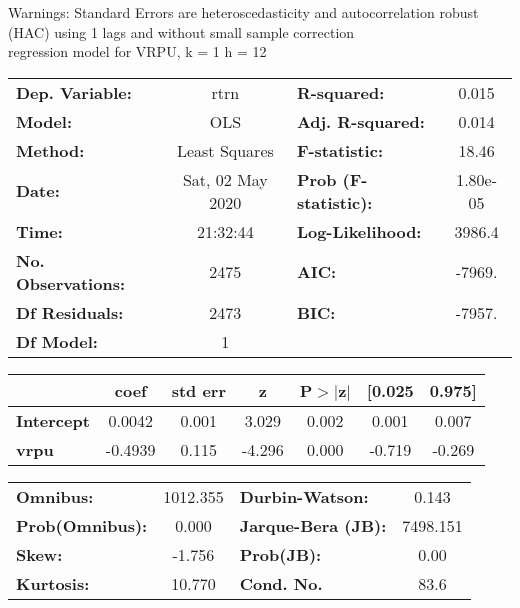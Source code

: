 Warnings: \newline
 [1] Standard Errors are heteroscedasticity and autocorrelation robust (HAC) using 1 lags and without small sample correction\\ 

regression model for VRPU, k = 1 h = 12\begin{center}
\begin{tabular}{lclc}
\toprule
\textbf{Dep. Variable:}    &       rtrn       & \textbf{  R-squared:         } &     0.015   \\
\textbf{Model:}            &       OLS        & \textbf{  Adj. R-squared:    } &     0.014   \\
\textbf{Method:}           &  Least Squares   & \textbf{  F-statistic:       } &     18.46   \\
\textbf{Date:}             & Sat, 02 May 2020 & \textbf{  Prob (F-statistic):} &  1.80e-05   \\
\textbf{Time:}             &     21:32:44     & \textbf{  Log-Likelihood:    } &    3986.4   \\
\textbf{No. Observations:} &        2475      & \textbf{  AIC:               } &    -7969.   \\
\textbf{Df Residuals:}     &        2473      & \textbf{  BIC:               } &    -7957.   \\
\textbf{Df Model:}         &           1      & \textbf{                     } &             \\
\bottomrule
\end{tabular}
\begin{tabular}{lcccccc}
                   & \textbf{coef} & \textbf{std err} & \textbf{z} & \textbf{P$> |$z$|$} & \textbf{[0.025} & \textbf{0.975]}  \\
\midrule
\textbf{Intercept} &       0.0042  &        0.001     &     3.029  &         0.002        &        0.001    &        0.007     \\
\textbf{vrpu}      &      -0.4939  &        0.115     &    -4.296  &         0.000        &       -0.719    &       -0.269     \\
\bottomrule
\end{tabular}
\begin{tabular}{lclc}
\textbf{Omnibus:}       & 1012.355 & \textbf{  Durbin-Watson:     } &    0.143  \\
\textbf{Prob(Omnibus):} &   0.000  & \textbf{  Jarque-Bera (JB):  } & 7498.151  \\
\textbf{Skew:}          &  -1.756  & \textbf{  Prob(JB):          } &     0.00  \\
\textbf{Kurtosis:}      &  10.770  & \textbf{  Cond. No.          } &     83.6  \\
\bottomrule
\end{tabular}
\end{center}

